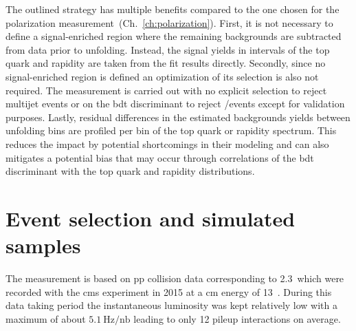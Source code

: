 The outlined strategy has multiple benefits compared to the one chosen for the polarization measurement~(Ch.~\ref{ch:polarization}). First, it is not necessary to define a signal-enriched region where the remaining backgrounds are subtracted from data prior to unfolding. Instead, the signal yields in intervals of the top quark \pt and rapidity are taken from the fit results directly. Secondly, since no signal-enriched region is defined an optimization of its selection is also not required. The measurement is carried out with no explicit selection to reject multijet events or on the \gls{bdt} discriminant to reject \wjets/\ttbar events except for validation purposes. Lastly, residual differences in the estimated backgrounds yields between unfolding bins are profiled per bin of the top quark \pt or rapidity spectrum. This reduces the impact by potential shortcomings in their modeling and can also mitigates a potential bias that may occur through correlations of the \gls{bdt} discriminant with the top quark \pt and rapidity distributions.



\section{Event selection and simulated samples}
\label{sec:diff13-selection}

The measurement is based on \gls{pp} collision data corresponding to 2.3~\invfb which were recorded with the \gls{cms} experiment in 2015 at a \acrlong{cm} energy of 13~\TeV. During this data taking period the instantaneous luminosity was kept relatively low with a maximum of about $5.1~\mathrm{Hz}/\mathrm{nb}$ leading to only 12 pileup interactions on average. 

